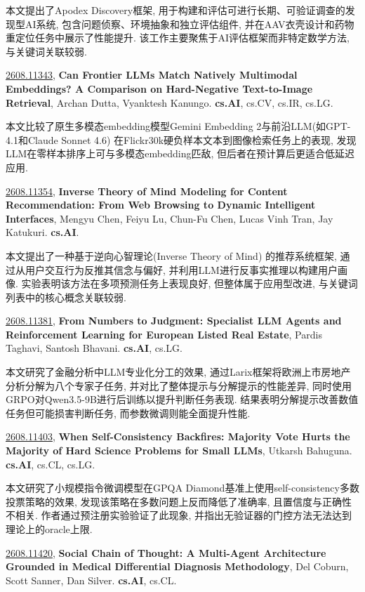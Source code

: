 \documentclass[9pt, a4paper]{article}
\theoremstyle{plain}
\theoremstyle{definition}
\theoremstyle{remark}
\newcommand{\arxivwithtarget}[3]{\hypertarget{#1}{}\href{https://arxiv.org/abs/#1}{#1}, \textbf{\textcolor{arxivblue}{#2}}, #3. }
\begin{document}
本文提出了Apodex Discovery框架, 用于构建和评估可进行长期、可验证调查的发现型AI系统, 包含问题侦察、环境抽象和独立评估组件, 并在AAV衣壳设计和药物重定位任务中展示了性能提升. 该工作主要聚焦于AI评估框架而非特定数学方法, 与关键词关联较弱.


\arxivwithtarget{2608.11343}{Can Frontier LLMs Match Natively Multimodal Embeddings? A Comparison on Hard-Negative Text-to-Image Retrieval}{Archan Dutta, Vyanktesh Kanungo}\textbf{cs.AI}, cs.CV, cs.IR, cs.LG.

本文比较了原生多模态embedding模型Gemini Embedding 2与前沿LLM(如GPT-4.1和Claude Sonnet 4.6) 在Flickr30k硬负样本文本到图像检索任务上的表现, 发现LLM在零样本排序上可与多模态embedding匹敌, 但后者在预计算后更适合低延迟应用.


\arxivwithtarget{2608.11354}{Inverse Theory of Mind Modeling for Content Recommendation: From Web Browsing to Dynamic Intelligent Interfaces}{Mengyu Chen, Feiyu Lu, Chun-Fu Chen, Lucas Vinh Tran, Jay Katukuri}\textbf{cs.AI}.

本文提出了一种基于逆向心智理论(Inverse Theory of Mind) 的推荐系统框架, 通过从用户交互行为反推其信念与偏好, 并利用LLM进行反事实推理以构建用户画像. 实验表明该方法在多项预测任务上表现良好, 但整体属于应用型改进, 与关键词列表中的核心概念关联较弱.


\arxivwithtarget{2608.11381}{From Numbers to Judgment: Specialist LLM Agents and Reinforcement Learning for European Listed Real Estate}{Pardis Taghavi, Santosh Bhavani}\textbf{cs.AI}, cs.LG.

本文研究了金融分析中LLM专业化分工的效果, 通过Larix框架将欧洲上市房地产分析分解为八个专家子任务, 并对比了整体提示与分解提示的性能差异, 同时使用GRPO对Qwen3.5-9B进行后训练以提升判断任务表现. 结果表明分解提示改善数值任务但可能损害判断任务, 而参数微调则能全面提升性能.


\arxivwithtarget{2608.11403}{When Self-Consistency Backfires: Majority Vote Hurts the Majority of Hard Science Problems for Small LLMs}{Utkarsh Bahuguna}\textbf{cs.AI}, cs.CL, cs.LG.

本文研究了小规模指令微调模型在GPQA Diamond基准上使用self-consistency多数投票策略的效果, 发现该策略在多数问题上反而降低了准确率, 且置信度与正确性不相关. 作者通过预注册实验验证了此现象, 并指出无验证器的门控方法无法达到理论上的oracle上限.


\arxivwithtarget{2608.11420}{Social Chain of Thought: A Multi-Agent Architecture Grounded in Medical Differential Diagnosis Methodology}{Del Coburn, Scott Sanner, Dan Silver}\textbf{cs.AI}, cs.CL.
\end{document}
